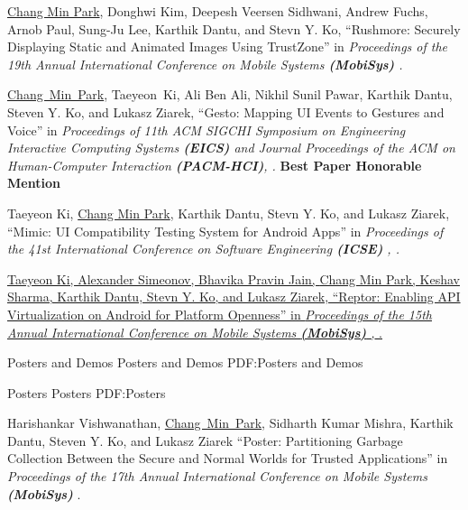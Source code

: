 \documentclass[letterpaper,MMMyyyy,nonstopmode]{simpleresumecv}
\begin{document}
\begin{Body}
\Gap
\NumberedItem{[1]}
\underline{Chang Min Park}, Donghwi Kim, Deepesh Veersen Sidhwani, Andrew Fuchs, Arnob Paul,
Sung-Ju Lee, Karthik Dantu, and Stevn Y. Ko,
``Rushmore: Securely Displaying Static and Animated Images Using TrustZone'' in
\textit{Proceedings of the 19th Annual International Conference on Mobile Systems \textbf{(MobiSys)}
.}


\Gap
\NumberedItem{[2]} 
\underline{Chang~Min~Park}, Taeyeon~Ki, Ali Ben Ali, 
Nikhil Sunil Pawar, Karthik Dantu, Steven Y. Ko, and Lukasz Ziarek, 
``Gesto: Mapping UI Events to Gestures and Voice'' in
\textit{Proceedings of 11th ACM SIGCHI Symposium on Engineering Interactive Computing Systems \textbf{(EICS)}
and \textit{Journal Proceedings of the ACM on Human-Computer Interaction \textbf{(PACM-HCI)}}, .}
\linebreak\textbf{Best Paper Honorable Mention}

\Gap
\NumberedItem{[3]}
Taeyeon Ki, \underline{Chang Min Park}, Karthik Dantu, Stevn Y. Ko, and Lukasz Ziarek, 
``Mimic: UI Compatibility Testing System for Android Apps'' in
\textit{Proceedings of the 41st International Conference on Software Engineering \textbf{(ICSE)}
, .}

\Gap
\NumberedItem{[4]}
\href{https://dl.acm.org/citation.cfm?id=3081341}
{Taeyeon Ki, Alexander Simeonov, Bhavika Pravin Jain, \underline{Chang Min Park},
Keshav Sharma, Karthik Dantu, Stevn Y. Ko, and Lukasz Ziarek, 
``Reptor: Enabling API Virtualization on Android for Platform Openness'' in 
\textit{Proceedings of the 15th Annual International Conference on Mobile Systems \textbf{(MobiSys)}
, }.}




\vspace{1ex}
\Section
{Posters and Demos}
{Posters and Demos}
{PDF:Posters and Demos}

\SubSection
{Posters}
{Posters}
{PDF:Posters}

\begingroup
\renewcommand{\MaxNumberedItem}{[88]}

\BigGap
\NumberedItem{[1]}
Harishankar Vishwanathan, \underline{Chang~Min~Park}, Sidharth Kumar Mishra, Karthik Dantu, 
Steven Y. Ko, and Lukasz Ziarek
``Poster: Partitioning Garbage Collection Between the Secure and Normal Worlds for Trusted Applications'' in
\textit{Proceedings of the 17th Annual International Conference on Mobile Systems \textbf{(MobiSys)}
}.


\end{Body}
\end{document}
